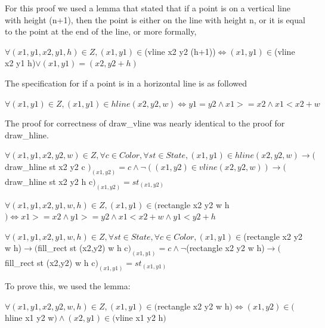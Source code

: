 \documentclass{llncs}
\begin{document}
For this proof we used a lemma that stated that if a point is on a vertical line with height (n+1), then the point is either on the line with height n, or it is equal to the point at the end of the line, or more formally,

\begin {lemma} 
$\forall (x1,y1,x2,y1,h) \in Z, (x1,y1) \in $(vline x2 y2 (h+1))$ \iff (x1,y1) \in $(vline x2 y1 h)$ \lor (x1,y1)=(x2,y2+h)$
\end {lemma}


The specification for if a point is in a horizontal line is as followed

\begin {definition} [on\_hline]
$\forall (x1,y1) \in Z, (x1,y1) \in hline (x2,y2,w) \iff y1 = y2 \land x1 >= x2 \land x1 < x2 + w$
\end {definition}

The proof for correctness of draw\_vline was nearly identical to the proof for draw\_hline.
\begin {theorem} 
$\forall (x1,y1,x2,y2,w) \in Z, \forall c \in Color,\forall st \in State, (x1,y1) \in hline (x2,y2,w) \rightarrow ($ draw\_hline st x2 y2 c $)_{(x1,y2)} = c \land \neg ((x1,y2) \in vline (x2,y2,w)) \rightarrow ($draw\_hline st x2 y2 h c$)_{(x1,y2)} = st_{(x1,y2)} $
\end {theorem}



\begin {definition}[in\_rectangle]
	$\forall (x1,y1,x2,y1,w,h) \in Z, (x1,y1) \in ($rectangle x2 y2 w h$) \iff x1 >= x2 \land y1>=y2 \land x1 < x2 + w \land y1 < y2 + h $
\end {definition}

\begin {theorem} 
$\forall (x1,y1,x2,y1,w,h) \in Z, \forall st \in State, \forall c \in Color, (x1,y1) \in $(rectangle x2 y2 w h)$ \rightarrow ($fill\_rect st (x2,y2) w h c$)_{(x1,y1)} = c \land \neg $(rectangle x2 y2 w h)$ \rightarrow ($fill\_rect st (x2,y2) w h c$)_{(x1,y1)} = st_{(x1,y1)}$
\end {theorem}

To prove this, we used the lemma:

\begin {lemma} 
$\forall (x1,y1,x2,y2,w,h) \in Z, (x1,y1) \in ($rectangle x2 y2 w h$) \iff (x1,y2) \in ($hline x1 y2 w$) \land (x2,y1) \in ($vline x1 y2 h$) $
\end {lemma}
\end{document}
